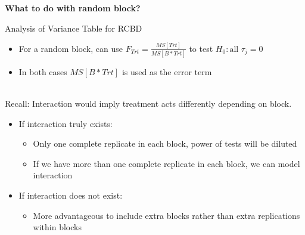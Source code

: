 \textbf{What to do with random block?}\\
    \begin{center}Analysis of Variance Table for RCBD\end{center}
    \begin{itemize}
   		\item{For a random block, can use $F_{Trt}=\frac{MS[Trt]}{MS[B*Trt]}$ to test $H_{0}: \text{all } \tau_{j}=0$}
   		\item{In both cases $MS[B*Trt]$ is used as the error term}\\
		\end{itemize} 
~\\
Recall: Interaction would imply treatment acts differently depending on block.
\begin{itemize}
    \item{If interaction truly exists:}
    \begin{itemize}
        \item{Only one complete replicate in each block, power of tests will be diluted}
        \item{If we have more than one complete replicate in each block, we can model interaction}
     \end{itemize}
     \item{If interaction does not exist:}
			\begin{itemize}
			  \item{More advantageous to include extra blocks rather than extra replications within blocks}
    \end{itemize}
	\end{itemize}
	

